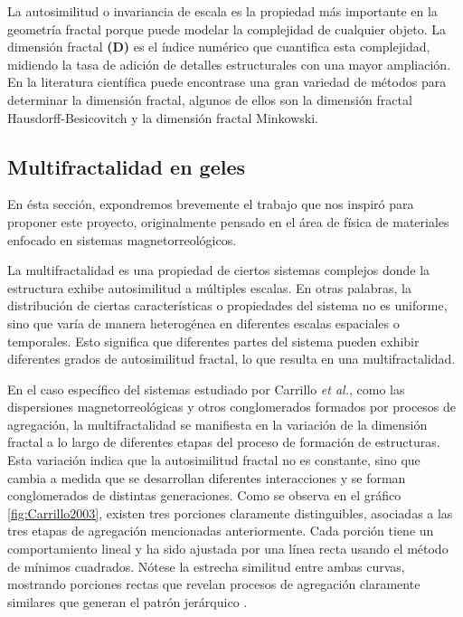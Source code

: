 \documentclass[11pt]{article}
\begin{document}
La autosimilitud o invariancia de escala es la propiedad m\'{a}s importante en la geometr\'{i}a fractal porque puede modelar la complejidad de cualquier objeto. La dimensi\'{o}n fractal \textbf{(D)} es el \'{i}ndice num\'{e}rico que cuantifica esta complejidad, midiendo la tasa de adici\'{o}n de detalles estructurales con una mayor ampliaci\'{o}n. En la literatura cient\'{i}fica puede encontrase una gran variedad de m\'{e}todos para determinar la dimensi\'{o}n fractal, algunos de ellos son la dimensi\'{o}n fractal Hausdorff-Besicovitch y la dimensi\'{o}n fractal Minkowski.


\subsection{Multifractalidad en geles}
\label{subsec:subseccion2.2}

En \'{e}sta secci\'{o}n, expondremos brevemente el
trabajo que nos inspir\'{o} para proponer este proyecto, 
originalmente pensado en el \'{a}rea de f\'{i}sica de materiales 
enfocado en sistemas magnetorreol\'{o}gicos. 

La multifractalidad es una propiedad de ciertos sistemas
 complejos donde la estructura exhibe autosimilitud a m\'{u}ltiples 
 escalas. En otras palabras, la distribuci\'{o}n de ciertas 
 caracter\'{i}sticas o propiedades del sistema no es uniforme,
  sino que var\'{i}a de manera heterog\'{e}nea en diferentes 
  escalas espaciales o temporales. Esto significa que diferentes
   partes del sistema pueden exhibir diferentes grados de autosimilitud 
   fractal, lo que resulta en una multifractalidad.

En el caso espec\'{i}fico del sistemas estudiado por  
Carrillo \textit{et al.}\cite{Carrillo2003}, como las dispersiones
 magnetorreol\'{o}gicas y otros conglomerados formados 
 por procesos de agregaci\'{o}n, la multifractalidad se 
 manifiesta en la variaci\'{o}n de la dimensi\'{o}n fractal 
 a lo largo de diferentes etapas del proceso de formaci\'{o}n 
 de estructuras. Esta variaci\'{o}n indica que la autosimilitud
  fractal no es constante, sino que cambia a medida que se 
  desarrollan diferentes interacciones y se forman conglomerados 
  de distintas generaciones. Como se observa en el gr\'{a}fico \ref{fig:Carrillo2003},
   existen tres porciones claramente distinguibles, asociadas a las tres etapas 
   de agregaci\'{o}n mencionadas anteriormente. Cada porci\'{o}n tiene un comportamiento lineal y ha sido ajustada por una l\'{i}nea recta usando el m\'{e}todo de m\'{i}nimos cuadrados. N\'{o}tese la estrecha similitud entre ambas curvas, mostrando porciones rectas que revelan procesos de agregaci\'{o}n claramente similares que generan el patr\'{o}n jer\'{a}rquico \cite{Carrillo2003}.
\end{document}
